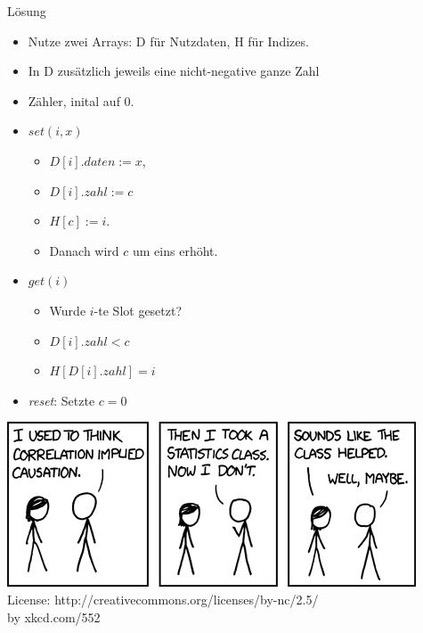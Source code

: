 \documentclass[18pt]{beamer}
\begin{document}
\begin{frame}{Lösung}
 \begin{itemize}
  \item Nutze zwei Arrays: D für Nutzdaten, H für Indizes.
  \item In D zusätzlich jeweils eine nicht-negative ganze Zahl
  \item Zähler, inital auf 0. \pause
  \item $\mathit{set}(i,x)$
    \begin{itemize}
     \item $D[i].\mathit{daten}:=x$, 
     \item $D[i].\mathit{zahl}:=c$ 
     \item $H[c]:=i$.
     \item Danach wird $c$ um eins erhöht.
    \end{itemize}
  \item $\mathit{get}(i)$
    \begin{itemize}
     \item Wurde $i$-te Slot gesetzt?
     \item $D[i].\mathit{zahl} < c$
     \item $H[D[i].\mathit{zahl}] = i$
    \end{itemize}
  \item \textit{reset}: Setzte $c=0$
 \end{itemize}

\end{frame}



\begin{frame}
\includegraphics[scale=0.7]{correlation} \\
License: http://creativecommons.org/licenses/by-nc/2.5/ \\
by xkcd.com/552
\end{frame}
\end{document}
